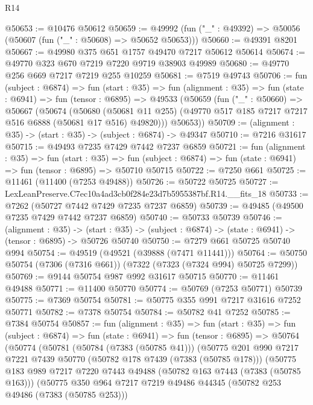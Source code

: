 \begin{lexlean}{R14}
\begin{coremodule}
@50653 := @10476 @50612
@50659 := @49992 (fun ("_" : @49392) => @50056 (@50607 (fun ("_" : @50608) => @50652 @50653)))
@50660 := @49391 @8201
@50667 := @49980 @375 @651 @1757 @49470 @7217 @50612 @50614
@50674 := @49770 @323 @670 @7219 @7220 @9719 @38903 @49989
@50680 := @49770 @256 @669 @7217 @7219 @255 @10259
@50681 := @7519 @49743
@50706 := fun (subject : @6874) =>
  fun (start : @35) =>
  fun (alignment : @35) =>
  fun (state : @6941) =>
  fun (tensor : @6895) =>
  @49533
    (@50659
      (fun ("_" : @50660) =>
      @50667
        (@50674
          (@50680
            (@50681 @11 @255)
            (@49770 @517 @185 @7217 @7217 @516 @6888 (@50681 @17 @516) @49820)))
        @50653))
@50709 := (alignment : @35) -> (start : @35) -> (subject : @6874) -> @49347
@50710 := @7216 @31617
@50715 := @49493 @7235 @7429 @7442 @7237 @6859
@50721 := fun (alignment : @35) =>
  fun (start : @35) =>
  fun (subject : @6874) => fun (state : @6941) => fun (tensor : @6895) => @50710 @50715
@50722 := @7250 @661
@50725 := @11461 (@11400 (@7253 @49488))
@50726 := @50722 @50725
@50727 := LexLeanPreserve.C7ec10a4ad3cb0f284e23d7b5955387bf.R14.__fits_18
@50733 := @7262 (@50727 @7442 @7429 @7235 @7237 @6859)
@50739 := @49485 (@49500 @7235 @7429 @7442 @7237 @6859)
@50740 := @50733 @50739
@50746 := (alignment : @35) ->
  (start : @35) -> (subject : @6874) -> (state : @6941) -> (tensor : @6895) -> @50726 @50740
@50750 := @7279 @661 @50725 @50740 @994
@50754 := @49519 (@49521 (@39888 (@7471 @11441)))
@50764 := @50750 @50754 (@7306 (@7316 @661)) (@7322 (@7323 (@7324 @994) @50725 @7299))
@50769 := @9144 @50754 @987 @992 @31617 @50715
@50770 := @11461 @49488
@50771 := @11400 @50770
@50774 := @50769 (@7253 @50771) @50739
@50775 := @7369 @50754
@50781 := @50775 @355 @991 @7217 @31616 @7252 @50771
@50782 := @7378 @50754
@50784 := @50782 @41 @7252
@50785 := @7384 @50754
@50857 := fun (alignment : @35) =>
  fun (start : @35) =>
  fun (subject : @6874) =>
  fun (state : @6941) =>
  fun (tensor : @6895) =>
  @50764
    (@50774
      (@50781
        (@50784 (@7383 (@50785 @41)))
        (@50775
          @201
          @990
          @7217
          @7221
          @7439
          @50770
          (@50782 @178 @7439 (@7383 (@50785 @178)))
          (@50775
            @183
            @989
            @7217
            @7220
            @7443
            @49488
            (@50782 @163 @7443 (@7383 (@50785 @163)))
            (@50775
              @350
              @964
              @7217
              @7219
              @49486
              @44345
              (@50782 @253 @49486 (@7383 (@50785 @253)))

\end{coremodule}
\end{lexlean}
